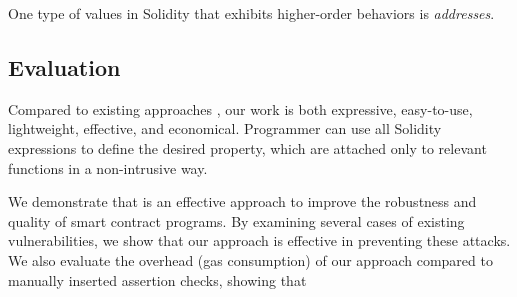 One type of values in Solidity that exhibits higher-order behaviors is \emph{addresses}.




\subsection*{\textbf{Evaluation}}

Compared to existing approaches , our work is both expressive,
easy-to-use, lightweight, effective, and economical.
Programmer can use all Solidity expressions to define the desired property,
which are attached only to relevant functions in a non-intrusive way.

We demonstrate that \lang is an effective approach to improve the robustness
and quality of smart contract programs.
By examining several cases of existing vulnerabilities, we show that our
approach is effective in preventing these attacks.
We also evaluate the overhead (gas consumption) of our approach compared to
manually inserted assertion checks, showing that 






